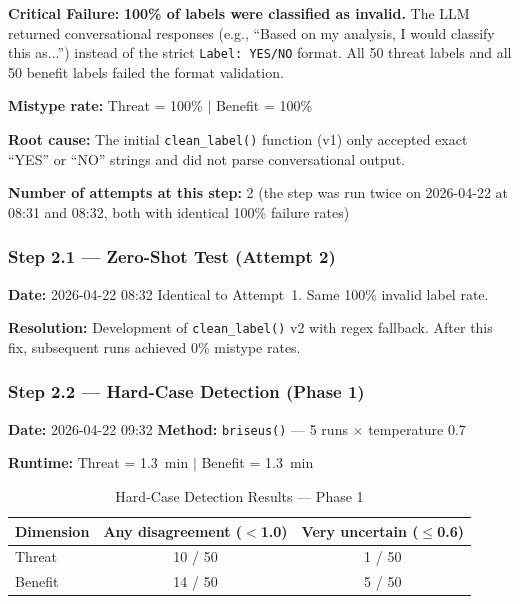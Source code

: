 \textbf{Critical Failure:} \textcolor{fail}{\textbf{100\% of labels were classified as invalid.}} The LLM returned conversational responses (e.g., ``Based on my analysis, I would classify this as...'') instead of the strict \texttt{Label: YES/NO} format. All 50 threat labels and all 50 benefit labels failed the format validation.

\textbf{Mistype rate:} Threat = 100\% $|$ Benefit = 100\%

\textbf{Root cause:} The initial \texttt{clean\_label()} function (v1) only accepted exact ``YES'' or ``NO'' strings and did not parse conversational output.

\textbf{Number of attempts at this step:} 2 (the step was run twice on 2026-04-22 at 08:31 and 08:32, both with identical 100\% failure rates)

\subsubsection{Step 2.1 --- Zero-Shot Test (Attempt 2)}

\textbf{Date:} 2026-04-22 08:32 \quad Identical to Attempt~1. Same 100\% invalid label rate.

\textbf{Resolution:} Development of \texttt{clean\_label()} v2 with regex fallback. After this fix, subsequent runs achieved 0\% mistype rates.

\subsubsection{Step 2.2 --- Hard-Case Detection (Phase 1)}
\label{sec:step22_phase1}

\textbf{Date:} 2026-04-22 09:32 \quad \textbf{Method:} \texttt{briseus()} --- 5 runs $\times$ temperature 0.7

\textbf{Runtime:} Threat = 1.3~min $|$ Benefit = 1.3~min

\begin{table}[H]
\centering
\caption{Hard-Case Detection Results --- Phase 1}
\begin{tabular}{@{}lcc@{}}
\toprule
\textbf{Dimension} & \textbf{Any disagreement ($<$1.0)} & \textbf{Very uncertain ($\leq$0.6)} \\
\midrule
Threat  & 10 / 50 & 1 / 50 \\
Benefit & 14 / 50 & 5 / 50 \\
\bottomrule
\end{tabular}
\end{table}

